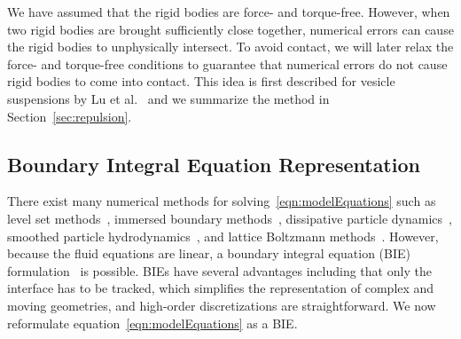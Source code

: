 \documentclass[AMA,STIX1COL]{WileyNJD-v2}
\begin{document}
We have assumed that the rigid bodies are force- and torque-free.
However, when two rigid bodies are brought sufficiently close together,
numerical errors can cause the rigid bodies to unphysically intersect.
To avoid contact,  we will later relax the force- and torque-free
conditions to guarantee that numerical errors do not cause rigid bodies
to come into contact.  This idea is first described for
vesicle suspensions by Lu et al.~\cite{Lu2017} and we summarize the
method in Section~\ref{sec:repulsion}.  


\subsection{Boundary Integral Equation Representation}
There exist many numerical methods for
solving~\eqref{eqn:modelEquations} such as level set
methods~\cite{Dou2007}, immersed boundary methods~\cite{Mittal2005},
dissipative particle dynamics~\cite{Pivkin2010}, smoothed particle
hydrodynamics~\cite{Polfer2016}, and lattice Boltzmann
methods~\cite{Ladd1994a, Ladd1994b}. However, because the fluid
equations are linear, a boundary integral equation (BIE)
formulation~\cite{Pozrikidis1992} is possible.  BIEs have several
advantages including that only the interface has to be tracked, which
simplifies the representation of complex and moving geometries, and
high-order discretizations are straightforward.  We now reformulate
equation~\eqref{eqn:modelEquations} as a BIE.
\end{document}
